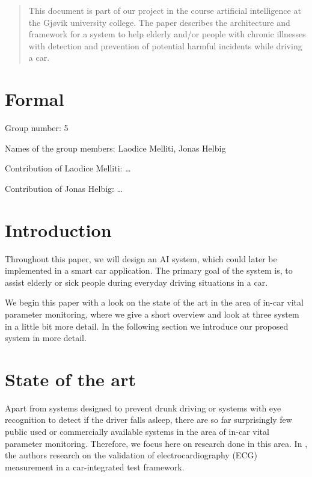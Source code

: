 \documentclass[a4paper]{article}
\author{			%
Laodice Melliti\\
Matr.-Nr: 140159\\
{\tt laodice.melliti@hig.no}
\and 
Jonas Helbig\\
Matr.-Nr: 140165\\
{\tt jonas.helbig@hig.no}
\vspace{1cm}}
\begin{document}
	
\maketitle				%
\thispagestyle{empty} 	%
\begin{abstract}		%
	\noindent			%
	This document is part of our project in the course artificial intelligence at the Gj\o{}vik university college. The paper describes the architecture and framework for a system to help elderly and/or people with chronic illnesses with detection and prevention of potential harmful incidents while driving a car. 
\end{abstract}

\newpage				%
\tableofcontents		%
\newpage
\section{Formal}
Group number: 5

Names of the group members: Laodice Melliti, Jonas Helbig

Contribution of Laodice Melliti: \dots

Contribution of Jonas Helbig: \dots
\section{Introduction}
Throughout this paper, we will design an AI system, which could later be implemented in a smart car application. The primary goal of the system is, to assist elderly or sick people during everyday driving situations in a car.

We begin this paper with a look on  the state of the art in the area of in-car vital parameter monitoring, where we give a short overview and look at three system in a little bit more detail. In the following section we introduce our proposed system in more detail.
\section{State of the art}
Apart from systems designed to prevent drunk driving or systems with eye recognition to detect if the driver falls asleep, there are so far surprisingly few public used or commercially available systems in the area of in-car vital parameter monitoring. Therefore, we focus here on research done in this area. In \cite{schneider:12}, the authors research on the validation of electrocardiography (ECG) measurement in a car-integrated test framework.
\end{document}
